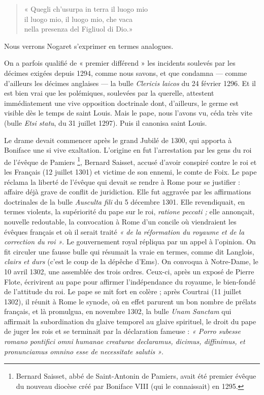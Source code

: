 \documentclass[french,twoside]{book} %
\newcommand{\labelchar}[1]{{\color{rubric}\bf #1}}
\begin{document}
\begin{verse}
« Quegli ch’usurpa in terra il luogo mio\\
il luogo mio, il luogo mio, che vaca\\
nella presenza del Figliuol di Dio.»\\
\end{verse}

\noindent Nous verrons Nogaret s’exprimer en termes analogues.\par
\bigbreak
\noindent \labelchar{2)} On a parfois qualifié de « premier différend » les incidents soulevés par les décimes exigées depuis 1294, comme nous savons, et que condamna — comme d’ailleurs les décimes anglaises — la bulle {\itshape Clericis laicos} du 24 février 1296. Et il est bien vrai que les polémiques, soulevées par la querelle, attestent immédiatement une vive opposition doctrinale dont, d’ailleurs, le germe est visible dès le temps de saint Louis. Mais le pape, nous l’avons vu, céda très vite (bulle {\itshape Etsi statu}, du 31 juillet 1297). Puis il canonisa saint Louis.\par
\par
\bigbreak
\noindent \labelchar{3)} Le drame devait commencer après le grand Jubilé de 1300, qui apporta à Boniface une si vive exaltation. L’origine en fut l’arrestation par les gens du roi de l’évêque de Pamiers \footnote{Bernard Saisset, abbé de Saint-Antonin de Pamiers, avait été premier évêque du nouveau diocèse créé par Boniface VIII (qui le connaissait) en 1295.}, Bernard Saisset, accusé d’avoir conspiré contre le roi et les Français (12 juillet 1301) et victime de son ennemi, le comte de Foix. Le pape réclama la liberté de l’évêque qui devait se rendre à Rome pour se justifier : affaire déjà grave de conflit de juridiction. Elle fut aggravée par les affirmations doctrinales de la bulle {\itshape Ausculta fili} du 5 décembre 1301. Elle revendiquait, en termes violents, la supériorité du pape sur le roi, {\itshape ratione peccati ;} elle annonçait, nouvelle redoutable, la convocation à Rome d’un concile où viendraient les évêques français et où il serait traité \emph{« de la réformation du royaume et de la correction du roi »}. Le gouvernement royal répliqua par un appel à l’opinion. On fit circuler une fausse bulle qui résumait la vraie en termes, comme dit Langlois, \emph{clairs et  
\label{p52} durs} (c’est le coup de la dépêche d’Ems). On convoqua à Notre-Dame, le 10 avril 1302, une assemblée des trois ordres. Ceux-ci, après un exposé de Pierre Flote, écrivirent au pape pour affirmer l’indépendance du royaume, le bien-fondé de l’attitude du roi. Le pape se mit fort en colère ; après Courtrai (11 juillet 1302), il réunit à Rome le synode, où en effet parurent un bon nombre de prélats français, et là promulgua, en novembre 1302, la bulle {\itshape Unam Sanctam} qui affirmait la subordination du glaive temporel au glaive spirituel, le droit du pape de juger les rois et se terminait par la déclaration fameuse : \emph{« Porro subesse romano pontifici omni humanae creaturae declaramus, dicimus, diffinimus, et pronunciamus omnino esse de necessitate salutis »}.\par
\end{document}
